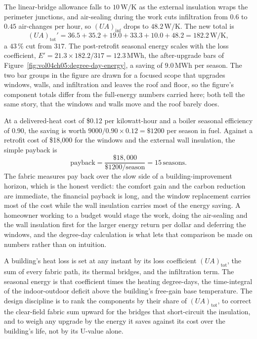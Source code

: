 The linear-bridge allowance falls to $10\,\text{W}/\si{\kelvin}$ as the
external insulation wraps the perimeter junctions, and air-sealing during
the work cuts infiltration from $0.6$ to $0.45$ air-changes per hour, so
$(UA)_{\text{inf}}$ drops to $48.2\,\text{W}/\si{\kelvin}$. The new total
is
\[
(UA)_{\text{tot}}' = 36.5 + 35.2 + 19.0 + 33.3 + 10.0 + 48.2 =
182.2\,\text{W}/\si{\kelvin},
\]
a $43\,\%$ cut from $317$. The post-retrofit seasonal energy scales with
the loss coefficient, $E' = 21.3 \times 182.2/317 = 12.3\,\text{MWh}$, the
after-upgrade bars of Figure~\ref{fig:vol04ch05:degree-day-energy}, a
saving of $9.0\,\text{MWh}$ per season. The two bar groups in the figure
are drawn for a focused scope that upgrades windows, walls, and
infiltration and leaves the roof and floor, so the figure's component
totals differ from the full-energy numbers carried here; both tell the
same story, that the windows and walls move and the roof barely does.

At a delivered-heat cost of \$0.12 per kilowatt-hour and a boiler seasonal
efficiency of $0.90$, the saving is worth $9000/0.90 \times 0.12 =
\$1200$ per season in fuel. Against a retrofit cost of \$18{,}000 for the
windows and the external wall insulation, the simple payback is
\[
\text{payback} = \frac{\$18{,}000}{\$1200/\text{season}} = 15\,\text{
seasons}.
\]
The fabric measures pay back over the slow side of a building-improvement
horizon, which is the honest verdict: the comfort gain and the carbon
reduction are immediate, the financial payback is long, and the window
replacement carries most of the cost while the wall insulation carries
most of the energy saving. A homeowner working to a budget would stage the
work, doing the air-sealing and the wall insulation first for the larger
energy return per dollar and deferring the windows, and the degree-day
calculation is what lets that comparison be made on numbers rather than on
intuition.

\begin{principle}
A building's heat loss is set at any instant by its loss coefficient
$(UA)_{\text{tot}}$, the sum of every fabric path, its thermal bridges,
and the infiltration term. The seasonal energy is that coefficient times
the heating degree-days, the time-integral of the indoor-outdoor deficit
above the building's free-gain base temperature. The design discipline is
to rank the components by their share of $(UA)_{\text{tot}}$, to correct
the clear-field fabric sum upward for the bridges that short-circuit the
insulation, and to weigh any upgrade by the energy it saves against its
cost over the building's life, not by its U-value alone.
\end{principle}

